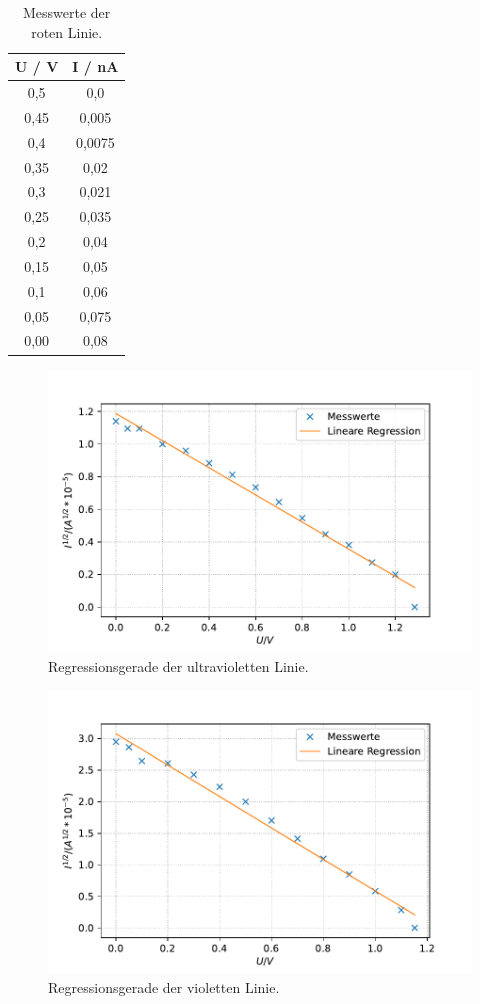 \begin{table}
  \centering
  \caption{Messwerte der roten Linie.}
  \label{tab:spek5}
  \begin{tabular}{c c}
    \toprule
    U / V & I / nA \\
    \midrule
      0,5 &    0,0 \\
     0,45 &  0,005 \\
      0,4 & 0,0075 \\
     0,35 &   0,02 \\
      0,3 &  0,021 \\
     0,25 &  0,035 \\
      0,2 &   0,04 \\
     0,15 &   0,05 \\
      0,1 &   0,06 \\
     0,05 &  0,075 \\
     0,00 &   0,08 \\
    \bottomrule
    \end{tabular}
\end{table}

\begin{figure}
  \center
  \caption{Regressionsgerade der ultravioletten Linie.}\label{fig:spek1}
  \includegraphics[width=0.8\linewidth]{pictures/spek1.pdf}
\end{figure}

\begin{figure}
  \center
  \caption{Regressionsgerade der violetten Linie.}\label{fig:spek2}
  \includegraphics[width=0.8\linewidth]{pictures/spek2.pdf}
\end{figure}

